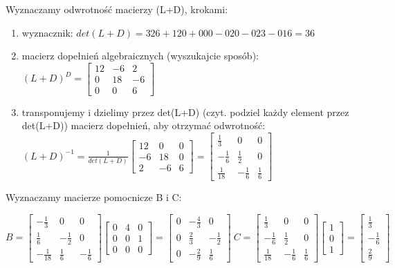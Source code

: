 \documentclass{article}
\begin{document}
Wyznaczamy odwrotność macierzy (L+D), krokami:
\begin{enumerate}
    \item wyznacznik: $det(L+D) = 326 + 120 + 000 - 020-023-016 = 36$ 
    \item macierz dopełnień algebraicznych (wyszukajcie sposób):
$ (L+D)^D = 
\begin{bmatrix}
    12 & -6 & 2 \\
    0 & 18 & -6 \\
    0 & 0 & 6
\end{bmatrix}
$
    \item transponujemy i dzielimy przez det(L+D) (czyt. podziel każdy element przez det(L+D)) macierz dopełnień, aby otrzymać odwrotność:
$
(L+D)^{-1} = \frac{1}{det(L+D)}
\begin{bmatrix}
    12 & 0 & 0 \\
    -6 & 18 & 0 \\
    2 & -6 & 6
\end{bmatrix}
=
\begin{bmatrix}
    \frac{1}{3} & 0 & 0 \\
    -\frac{1}{6} & \frac{1}{2} & 0 \\
    \frac{1}{18} & -\frac{1}{6} & \frac{1}{6}
\end{bmatrix}
$
\end{enumerate}
Wyznaczamy macierze pomocnicze B i C:

$
B = 
\begin{bmatrix}
    -\frac{1}{3} & 0 & 0 \\
    \frac{1}{6} & -\frac{1}{2} & 0 \\
    -\frac{1}{18} & \frac{1}{6} & -\frac{1}{6}
\end{bmatrix}
\begin{bmatrix}
    0 & 4 & 0 \\
    0 & 0 & 1 \\
    0 & 0 & 0 
\end{bmatrix} 
= 
\begin{bmatrix}
    0 & -\frac{4}{3} & 0 \\
    0 & \frac{2}{3} & -\frac{1}{2} \\
    0 & -\frac{2}{9} & \frac{1}{6} 
\end{bmatrix} 
\
C = 
\begin{bmatrix}
    \frac{1}{3} & 0 & 0 \\
    -\frac{1}{6} & \frac{1}{2} & 0 \\
    \frac{1}{18} & -\frac{1}{6} & \frac{1}{6}
\end{bmatrix}
\begin{bmatrix}
    1\\0\\1
\end{bmatrix}
=
\begin{bmatrix}
    \frac{1}{3}\\-\frac{1}{6}\\\frac{2}{9}
\end{bmatrix}
$
\end{document}

